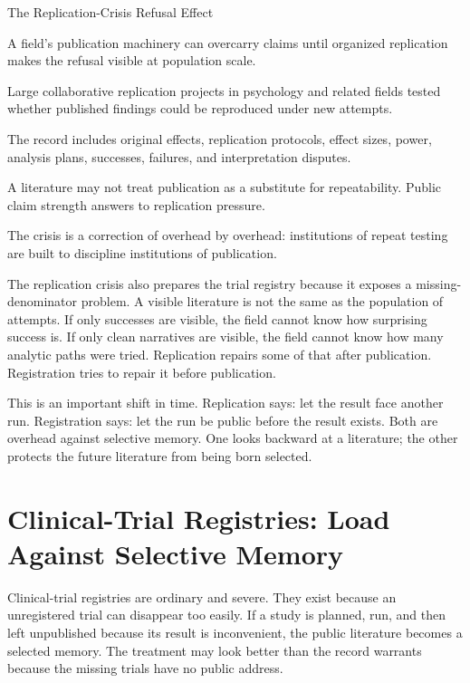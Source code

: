 \begin{phenom}{The Replication-Crisis Refusal Effect~\cite{openscience2015}}
\label{ph:replication-crisis}

\PhStatement
A field's publication machinery can overcarry claims until organized
replication makes the refusal visible at population scale.

\PhOrigin
Large collaborative replication projects in psychology and related fields
tested whether published findings could be reproduced under new attempts.

\PhObservation
The record includes original effects, replication protocols, effect sizes,
power, analysis plans, successes, failures, and interpretation disputes.

\PhConstraint
A literature may not treat publication as a substitute for repeatability.
Public claim strength answers to replication pressure.

\PhConsequence
The crisis is a correction of overhead by overhead: institutions of repeat
testing are built to discipline institutions of publication.
\end{phenom}

The replication crisis also prepares the trial registry because it exposes a
missing-denominator problem. A visible literature is not the same as the
population of attempts. If only successes are visible, the field cannot know
how surprising success is. If only clean narratives are visible, the field
cannot know how many analytic paths were tried. Replication repairs some of
that after publication. Registration tries to repair it before publication.

This is an important shift in time. Replication says: let the result face
another run. Registration says: let the run be public before the result
exists. Both are overhead against selective memory. One looks backward at a
literature; the other protects the future literature from being born selected.

\section{Clinical-Trial Registries: Load Against Selective Memory}

Clinical-trial registries are ordinary and severe. They exist because an
unregistered trial can disappear too easily. If a study is planned, run, and
then left unpublished because its result is inconvenient, the public
literature becomes a selected memory. The treatment may look better than the
record warrants because the missing trials have no public address.

